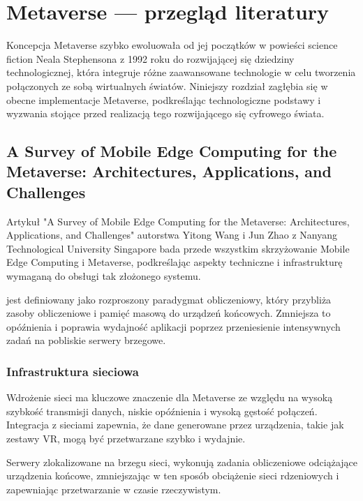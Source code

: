 \chapter{Metaverse --- przegląd literatury}

Koncepcja Metaverse szybko ewoluowała od jej początków w powieści science fiction Neala Stephensona  z 1992 roku do rozwijającej się dziedziny technologicznej, która integruje różne zaawansowane technologie w celu tworzenia połączonych ze sobą wirtualnych światów. Niniejszy rozdział zagłębia się w obecne implementacje Metaverse, podkreślając technologiczne podstawy i wyzwania stojące przed realizacją tego rozwijającego się cyfrowego świata.

\section{A Survey of Mobile Edge Computing for the
Metaverse: Architectures, Applications, and
Challenges}

Artykuł "A Survey of Mobile Edge Computing for the Metaverse: Architectures, Applications, and Challenges" autorstwa Yitong Wang i Jun Zhao z Nanyang Technological University Singapore bada przede wszystkim skrzyżowanie Mobile Edge Computing  i Metaverse, podkreślając aspekty techniczne i infrastrukturę wymaganą do obsługi tak złożonego systemu.

 jest definiowany jako rozproszony paradygmat obliczeniowy, który przybliża zasoby obliczeniowe i pamięć masową do urządzeń końcowych. Zmniejsza to opóźnienia i poprawia wydajność aplikacji poprzez przeniesienie intensywnych zadań na pobliskie serwery brzegowe.

\subsection{Infrastruktura sieciowa}

Wdrożenie sieci  ma kluczowe znaczenie dla Metaverse ze względu na wysoką szybkość transmisji danych, niskie opóźnienia i wysoką gęstość połączeń. Integracja  z sieciami  zapewnia, że dane generowane przez urządzenia, takie jak zestawy VR, mogą być przetwarzane szybko i wydajnie.

Serwery zlokalizowane na brzegu sieci, wykonują zadania obliczeniowe odciążające urządzenia końcowe, zmniejszając w ten sposób obciążenie sieci rdzeniowych i zapewniając przetwarzanie w czasie rzeczywistym.

